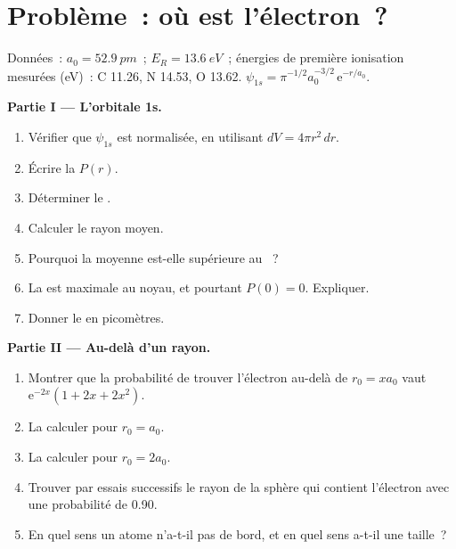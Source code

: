 \clearpage
\enlargethispage{3\baselineskip}
\section{Problème~: où est l'électron~?}

\begin{problem}
\label{pb:b2:atomic-orbitals:1}
Données~: $a_0 = \qty{52.9}{pm}$~; $E_R = \qty{13.6}{eV}$~; énergies de première ionisation
mesurées (\unit{eV})~: C 11.26, N 14.53, O 13.62. $\psi_{1s} = \pi^{-1/2}a_0^{-3/2}\,
\mathrm e^{-r/a_0}$.

\medskip
\noindent\textbf{Partie I --- L'orbitale 1s.}
\begin{enumerate}
  \item Vérifier que $\psi_{1s}$ est normalisée, en utilisant $dV = 4\pi r^2\,dr$.
  \item Écrire la  $P(r)$.
  \item Déterminer le .
  \item Calculer le rayon moyen.
  \item Pourquoi la moyenne est-elle supérieure au ~?
  \item La  est maximale au noyau, et pourtant $P(0) = 0$.
        Expliquer.
  \item Donner le  en picomètres.
\end{enumerate}

\medskip
\noindent\textbf{Partie II --- Au-delà d'un rayon.}
\begin{enumerate}[resume]
  \item Montrer que la probabilité de trouver l'électron au-delà de $r_0 =
        xa_0$ vaut $\mathrm e^{-2x}(1 + 2x + 2x^2)$.
  \item La calculer pour $r_0 = a_0$.
  \item La calculer pour $r_0 = 2a_0$.
  \item Trouver par essais successifs le rayon de la sphère qui contient l'électron avec une
        probabilité de 0.90.
  \item En quel sens un atome n'a-t-il pas de bord, et en quel sens a-t-il une taille~?
\end{enumerate}


\end{problem}
